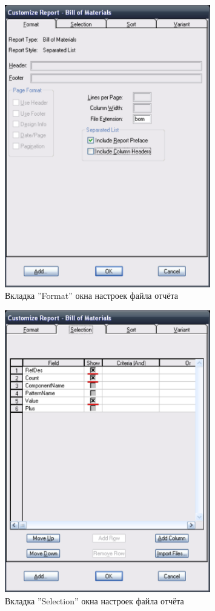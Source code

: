 \begin{figure}[H]\center
  \includegraphics[width=0.8\textwidth]{VP_auto/pictures/pcad/pic_pcad_customize_report_format}
  \caption{Вкладка ''Format'' окна настроек файла отчёта} \label{p:pic_pcad_customize_report_format}
\end{figure}

\newpage
\begin{figure}[H]\center
  \includegraphics[width=0.8\textwidth]{VP_auto/pictures/pcad/pic_pcad_customize_report_selection}
  \caption{Вкладка ''Selection'' окна настроек файла отчёта} \label{p:pic_pcad_customize_report_selection}
\end{figure}


